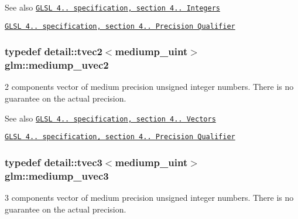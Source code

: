 \begin{DoxySeeAlso}{\-See also}
\href{http://www.opengl.org/registry/doc/GLSLangSpec.4.20.8.pdf}{\tt \-G\-L\-S\-L 4.. specification, section 4.. \-Integers} 

\href{http://www.opengl.org/registry/doc/GLSLangSpec.4.20.8.pdf}{\tt \-G\-L\-S\-L 4.. specification, section 4.. \-Precision \-Qualifier} 
\end{DoxySeeAlso}
\hypertarget{group__core__precision_ga95f22fddbbb9561e648aaa2a461be59c}{
\subsubsection[{mediump\-\_\-uvec2}]{\setlength{\rightskip}{0pt plus 5cm}typedef detail\-::tvec2$<$mediump\-\_\-uint$>$ {\bf glm\-::mediump\-\_\-uvec2}}}\label{group__core__precision_ga95f22fddbbb9561e648aaa2a461be59c}
2 components vector of medium precision unsigned integer numbers. \-There is no guarantee on the actual precision.

\begin{DoxySeeAlso}{\-See also}
\href{http://www.opengl.org/registry/doc/GLSLangSpec.4.20.8.pdf}{\tt \-G\-L\-S\-L 4.. specification, section 4.. \-Vectors} 

\href{http://www.opengl.org/registry/doc/GLSLangSpec.4.20.8.pdf}{\tt \-G\-L\-S\-L 4.. specification, section 4.. \-Precision \-Qualifier} 
\end{DoxySeeAlso}
\hypertarget{group__core__precision_gaa69cb8ff23d5c3daa3cf320136ac8e7d}{
\subsubsection[{mediump\-\_\-uvec3}]{\setlength{\rightskip}{0pt plus 5cm}typedef detail\-::tvec3$<$mediump\-\_\-uint$>$ {\bf glm\-::mediump\-\_\-uvec3}}}\label{group__core__precision_gaa69cb8ff23d5c3daa3cf320136ac8e7d}
3 components vector of medium precision unsigned integer numbers. \-There is no guarantee on the actual precision.

